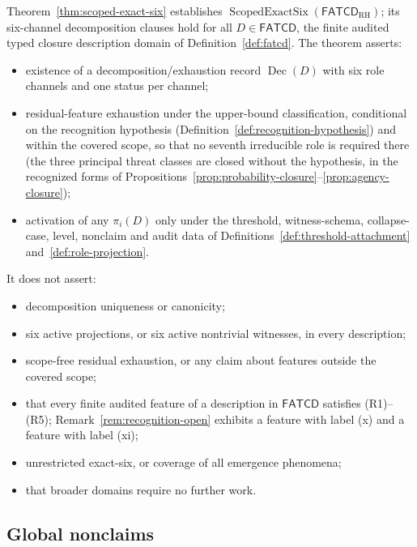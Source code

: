 \documentclass[11pt]{article}
\theoremstyle{definition}
\newcommand{\FATCD}{\ensuremath{\mathsf{FATCD}}}
\newcommand{\Dec}[1]{\ensuremath{\operatorname{Dec}\!\left(#1\right)}}
\newcommand{\ScopedExactSix}[1]{\ensuremath{\operatorname{ScopedExactSix}\!\left(#1\right)}}
\begin{document}
Theorem~\ref{thm:scoped-exact-six} establishes
\(\ScopedExactSix{\FATCD_{\mathrm{RH}}}\); its six-channel decomposition
clauses hold for all \(D\in\FATCD{}\), the finite audited typed closure
description domain of Definition~\ref{def:fatcd}. The theorem asserts:
\begin{itemize}[topsep=2pt,itemsep=1pt]
  \item existence of a decomposition/exhaustion record \(\Dec{D}\)
    with six role channels and one status per channel;
  \item residual-feature exhaustion under the upper-bound classification,
    conditional on the recognition hypothesis
    (Definition~\ref{def:recognition-hypothesis}) and within the covered scope,
    so that no seventh irreducible role is required there (the three principal
    threat classes are closed without the hypothesis, in the recognized
    forms of
    Propositions~\ref{prop:probability-closure}--\ref{prop:agency-closure});
  \item activation of any \(\pi_i(D)\) only under the threshold,
    witness-schema, collapse-case, level, nonclaim and audit data of
    Definitions~\ref{def:threshold-attachment} and~\ref{def:role-projection}.
\end{itemize}

It does not assert:
\begin{itemize}[topsep=2pt,itemsep=1pt]
  \item decomposition uniqueness or canonicity;
  \item six active projections, or six active nontrivial witnesses, in
    every description;
  \item scope-free residual exhaustion, or any claim about features
    outside the covered scope;
  \item that every finite audited feature of a description in \FATCD{}
    satisfies (R1)--(R5); Remark~\ref{rem:recognition-open} exhibits a
    feature with label (x) and a feature with label (xi);
  \item unrestricted exact-six, or coverage of all emergence
    phenomena;
  \item that broader domains require no further work.
\end{itemize}

\subsection{Global nonclaims}\label{subsec:global-nonclaims}
\end{document}
